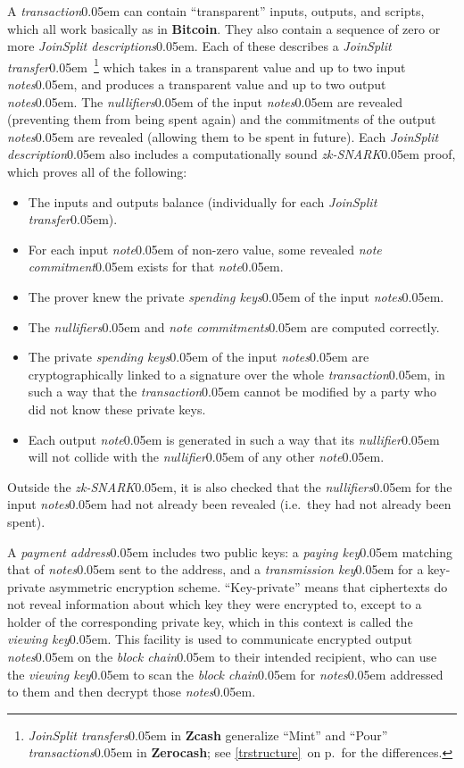 \documentclass{article}
\renewcommand{\emph}[1]{\hspace{0.15em}{\fontfamily{pnc}\selectfont\scalebox{1.02}[0.999]{\textit{#1}}}\hspace{0.02em}}
\newcommand{\crossref}[1]{\autoref{#1}\, \emph{`\nameref*{#1}\kern -0.05em'} on p.\,\pageref*{#1}}
\newcommand{\hairspace}{~\!}
\newcommand{\term}[1]{\textsl{#1}\kern 0.05em\xspace}
\newcommand{\termbf}[1]{\textbf{#1}\xspace}
\newcommand{\Zcash}{\termbf{Zcash}}
\newcommand{\Zerocash}{\termbf{Zerocash}}
\newcommand{\Bitcoin}{\termbf{Bitcoin}}
\newcommand{\note}{\term{note}}
\newcommand{\notes}{\term{notes}}
\newcommand{\noteCommitment}{\term{note commitment}}
\newcommand{\noteCommitments}{\term{note commitments}}
\newcommand{\joinSplitDescription}{\term{JoinSplit description}}
\newcommand{\joinSplitDescriptions}{\term{JoinSplit descriptions}}
\newcommand{\joinSplitTransfer}{\term{JoinSplit transfer}}
\newcommand{\joinSplitTransfers}{\term{JoinSplit transfers}}
\newcommand{\transaction}{\term{transaction}}
\newcommand{\transactions}{\term{transactions}}
\newcommand{\blockchain}{\term{block chain}}
\newcommand{\nullifier}{\term{nullifier}}
\newcommand{\nullifiers}{\term{nullifiers}}
\newcommand{\paymentAddress}{\term{payment address}}
\newcommand{\viewingKey}{\term{viewing key}}
\newcommand{\spendingKeys}{\term{spending keys}}
\newcommand{\payingKey}{\term{paying key}}
\newcommand{\transmissionKey}{\term{transmission key}}
\newcommand{\zkSNARK}{\term{zk-SNARK}}
\begin{document}
A \transaction can contain ``transparent'' inputs, outputs, and scripts, which
all work basically as in \Bitcoin. They also contain a sequence of zero or
more \joinSplitDescriptions. Each of these describes a \joinSplitTransfer\hairspace\footnote{
\joinSplitTransfers in \Zcash generalize ``Mint'' and ``Pour'' \transactions
in \Zerocash; see \crossref{trstructure} for the differences.}
which takes in a transparent value and up to two input \notes, and produces a
transparent value and up to two output \notes. The \nullifiers of the input
\notes are revealed (preventing them from being spent again) and the
commitments of the output \notes are revealed (allowing them to be spent in
future). Each \joinSplitDescription also includes a computationally sound
\zkSNARK proof, which proves all of the following:

\begin{itemize}
  \item The inputs and outputs balance (individually for each \joinSplitTransfer).
  \item For each input \note of non-zero value, some revealed \noteCommitment
        exists for that \note.
  \item The prover knew the private \spendingKeys of the input \notes.
  \item The \nullifiers and \noteCommitments are computed correctly.
  \item The private \spendingKeys of the input \notes are cryptographically
        linked to a signature over the whole \transaction, in such a way that
        the \transaction cannot be modified by a party who did not know these
        private keys.
  \item Each output \note is generated in such a way that its \nullifier will
        not collide with the \nullifier of any other \note.
\end{itemize}

Outside the \zkSNARK, it is also checked that the \nullifiers for the input
\notes had not already been revealed (i.e.\ they had not already been spent).

A \paymentAddress includes two public keys: a \payingKey matching that of \notes
sent to the address, and a \transmissionKey for a key-private asymmetric encryption
scheme. ``Key-private'' means that ciphertexts do not reveal information about
which key they were encrypted to, except to a holder of the corresponding
private key, which in this context is called the \viewingKey. This facility is
used to communicate encrypted output \notes on the \blockchain to their
intended recipient, who can use the \viewingKey to scan the \blockchain for
\notes addressed to them and then decrypt those \notes.
\end{document}

